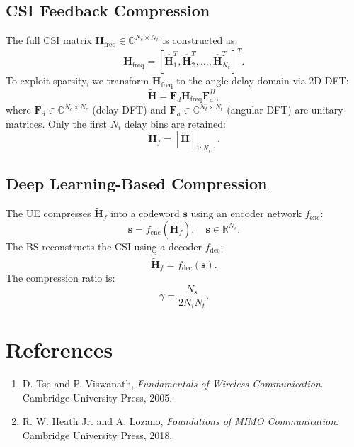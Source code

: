 \documentclass[10pt]{article}
\begin{document}
\subsection{CSI Feedback Compression}
The full CSI matrix \(\mathbf{H}_{\text{freq}} \in \mathbb{C}^{N_c \times N_t}\) is constructed as:
\begin{equation}
\mathbf{H}_{\text{freq}} = \left[\hat{\mathbf{H}}_1^T, \hat{\mathbf{H}}_2^T, \dots, \hat{\mathbf{H}}_{N_c}^T\right]^T.
\label{eq:full_csi}
\end{equation}
To exploit sparsity, we transform \(\mathbf{H}_{\text{freq}}\) to the angle-delay domain via 2D-DFT:
\begin{equation}
\tilde{\mathbf{H}} = \mathbf{F}_d \mathbf{H}_{\text{freq}} \mathbf{F}_a^H,
\label{eq:2d_dft}
\end{equation}
where \(\mathbf{F}_d \in \mathbb{C}^{N_c \times N_c}\) (delay DFT) and \(\mathbf{F}_a \in \mathbb{C}^{N_t \times N_t}\) (angular DFT) are unitary matrices. Only the first \(N_i\) delay bins are retained:
\begin{equation}
\tilde{\mathbf{H}}_f = \left[\tilde{\mathbf{H}}\right]_{1:N_i, :}.
\label{eq:sparse_csi}
\end{equation}

\subsection{Deep Learning-Based Compression}
The UE compresses \(\tilde{\mathbf{H}}_f\) into a codeword \(\mathbf{s}\) using an encoder network \(f_{\text{enc}}\):
\begin{equation}
\mathbf{s} = f_{\text{enc}}(\tilde{\mathbf{H}}_f), \quad \mathbf{s} \in \mathbb{R}^{N_s}.
\label{eq:encoder}
\end{equation}
The BS reconstructs the CSI using a decoder \(f_{\text{dec}}\):
\begin{equation}
\hat{\tilde{\mathbf{H}}}_f = f_{\text{dec}}(\mathbf{s}).
\label{eq:decoder}
\end{equation}
The compression ratio is:
\begin{equation}
\gamma = \frac{N_s}{2 N_i N_t}.
\label{eq:compression_ratio}
\end{equation}

\section{References}
\label{sec:references}

\begin{enumerate}
    \item \label{ref:tse} D. Tse and P. Viswanath, \textit{Fundamentals of Wireless Communication}. Cambridge University Press, 2005.
    \item \label{ref:heath} R. W. Heath Jr. and A. Lozano, \textit{Foundations of MIMO Communication}. Cambridge University Press, 2018.
\end{enumerate}
\end{document}
